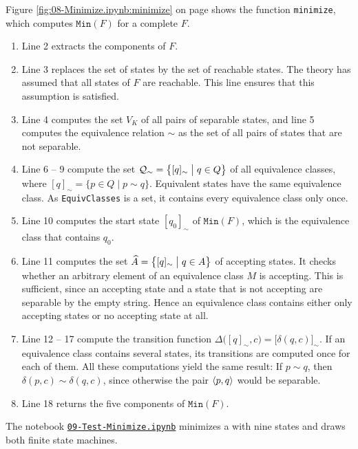 \noindent
Figure \ref{fig:08-Minimize.ipynb:minimize} on page \pageref{fig:08-Minimize.ipynb:minimize} shows the function
\texttt{minimize}, which computes $\texttt{Min}(F)$ for a complete  $F$.
\begin{enumerate}
\item Line 2 extracts the components of $F$.
\item Line 3 replaces the set of states by the set of reachable states.  The theory has assumed that all states
      of $F$ are reachable.  This line ensures that this assumption is satisfied.
\item Line 4 computes the set $V_K$ of all pairs of separable states, and line 5 computes the equivalence relation
      $\sim$ as the set of all pairs of states that are not separable.
\item Line 6 -- 9 compute the set $\mathcal{Q}_\sim = \bigl\{ [q]_\sim \bigm| q \in Q \bigr\}$ of all equivalence
      classes, where $[q]_\sim = \{ p \in Q \mid p \sim q \}$.  Equivalent states have the same equivalence class.
      As \texttt{EquivClasses} is a set, it contains every equivalence class only once.
\item Line 10 computes the start state $[q_0]_\sim$ of $\texttt{Min}(F)$, which is the equivalence class that
      contains $q_0$.
\item Line 11 computes the set $\widehat{A} = \bigl\{ [q]_\sim \bigm| q \in A \bigr\}$ of accepting states.  It
      checks whether an arbitrary element of an equivalence class $M$ is accepting.  This is sufficient, since an
      accepting state and a state that is not accepting are separable by the empty string.  Hence an equivalence
      class contains either only accepting states or no accepting state at all.
\item Line 12 -- 17 compute the transition function
      $\Delta\bigl([q]_\sim, c\bigr) = \bigl[ \delta(q, c) \bigr]_\sim$.  If an equivalence class contains several
      states, its transitions are computed once for each of them.  All these computations yield the same
      result:  If $p \sim q$, then $\delta(p, c) \sim \delta(q, c)$, since otherwise the pair $\pair(p,q)$ would
      be separable.
\item Line 18 returns the five components of $\texttt{Min}(F)$.
\end{enumerate}
The notebook
\href{https://github.com/karlstroetmann/Formal-Languages/blob/master/Python/Chapter-04-05/09-Test-Minimize.ipynb}{\texttt{09-Test-Minimize.ipynb}}
minimizes a  with nine states and draws both finite state machines.

